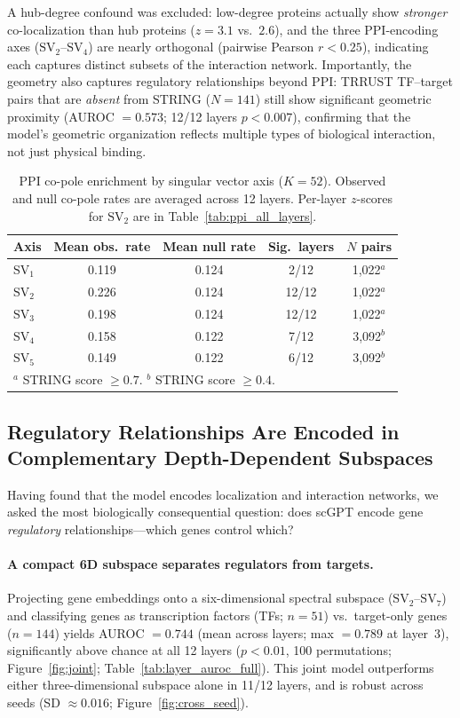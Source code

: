 \documentclass[10pt,twocolumn]{article}
\newcommand{\SV}[1]{\mathrm{SV}_{#1}}
\begin{document}
A hub-degree confound was excluded: low-degree proteins actually show \emph{stronger} co-localization than hub proteins ($z = 3.1$ vs.\ $2.6$), and the three PPI-encoding axes ($\SV{2}$--$\SV{4}$) are nearly orthogonal (pairwise Pearson $r < 0.25$), indicating each captures distinct subsets of the interaction network.
Importantly, the geometry also captures regulatory relationships beyond PPI: TRRUST TF--target pairs that are \emph{absent} from STRING ($N = 141$) still show significant geometric proximity (AUROC $= 0.573$; 12/12 layers $p < 0.007$), confirming that the model's geometric organization reflects multiple types of biological interaction, not just physical binding.

\begin{table}[!t]
\centering
\caption{PPI co-pole enrichment by singular vector axis ($K = 52$). Observed and null co-pole rates are averaged across 12 layers. Per-layer $z$-scores for $\SV{2}$ are in Table~\ref{tab:ppi_all_layers}.}
\label{tab:ppi_axis}
\small
\begin{tabular}{lcccc}
\toprule
Axis & Mean obs.\ rate & Mean null rate & Sig.\ layers & $N$ pairs \\
\midrule
$\SV{1}$ & 0.119 & 0.124 & 2/12 & 1{,}022$^a$ \\
$\SV{2}$ & 0.226 & 0.124 & 12/12 & 1{,}022$^a$ \\
$\SV{3}$ & 0.198 & 0.124 & 12/12 & 1{,}022$^a$ \\
$\SV{4}$ & 0.158 & 0.122 & 7/12 & 3{,}092$^b$ \\
$\SV{5}$ & 0.149 & 0.122 & 6/12 & 3{,}092$^b$ \\
\bottomrule
\multicolumn{5}{l}{\footnotesize $^a$ STRING score $\geq 0.7$. \quad $^b$ STRING score $\geq 0.4$.}
\end{tabular}
\end{table}

\subsection{Regulatory Relationships Are Encoded in Complementary Depth-Dependent Subspaces}
\label{sec:regulatory}

Having found that the model encodes localization and interaction networks, we asked the most biologically consequential question: does scGPT encode gene \emph{regulatory} relationships---which genes control which?

\paragraph{A compact 6D subspace separates regulators from targets.}
Projecting gene embeddings onto a six-dimensional spectral subspace ($\SV{2}$--$\SV{7}$) and classifying genes as transcription factors (TFs; $n = 51$) vs.\ target-only genes ($n = 144$) yields AUROC $= 0.744$ (mean across layers; max $= 0.789$ at layer~3), significantly above chance at all 12 layers ($p < 0.01$, 100 permutations; Figure~\ref{fig:joint}; Table~\ref{tab:layer_auroc_full}).
This joint model outperforms either three-dimensional subspace alone in 11/12 layers, and is robust across seeds (SD $\approx 0.016$; Figure~\ref{fig:cross_seed}).
\end{document}
